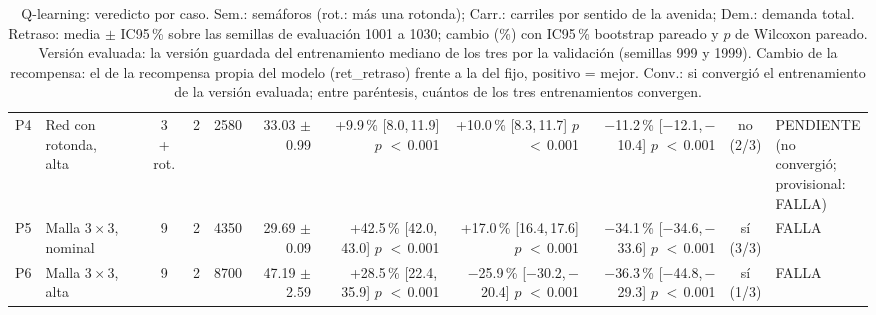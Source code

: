\begin{table}[H]
\begin{tabular}{llcrrrrrrcl}
P4 & \makecell[l]{Red con\\{}rotonda,\\{}alta} & \makecell[c]{3\\{}+ rot.} & 2 & 2580 & \makecell[r]{33.03\\{}$\pm$ 0.99} & \makecell[r]{+9.9\,\%\\{}[8.0,\,11.9]\\$p$ $<$\,0.001} & \makecell[r]{+10.0\,\%\\{}[8.3,\,11.7]\\$p$ $<$\,0.001} & \makecell[r]{$-$11.2\,\%\\{}[$-$12.1,\,$-$10.4]\\$p$ $<$\,0.001} & \makecell[c]{no\\{}(2/3)} & \makecell[l]{PENDIENTE\\{}(no convergió;\\{}provisional:\\{}FALLA)} \\
P5 & \makecell[l]{Malla $3 \times 3$,\\{}nominal} & 9 & 2 & 4350 & \makecell[r]{29.69\\{}$\pm$ 0.09} & \makecell[r]{+42.5\,\%\\{}[42.0,\,43.0]\\$p$ $<$\,0.001} & \makecell[r]{+17.0\,\%\\{}[16.4,\,17.6]\\$p$ $<$\,0.001} & \makecell[r]{$-$34.1\,\%\\{}[$-$34.6,\,$-$33.6]\\$p$ $<$\,0.001} & \makecell[c]{sí\\{}(3/3)} & FALLA \\
P6 & \makecell[l]{Malla $3 \times 3$,\\{}alta} & 9 & 2 & 8700 & \makecell[r]{47.19\\{}$\pm$ 2.59} & \makecell[r]{+28.5\,\%\\{}[22.4,\,35.9]\\$p$ $<$\,0.001} & \makecell[r]{$-$25.9\,\%\\{}[$-$30.2,\,$-$20.4]\\$p$ $<$\,0.001} & \makecell[r]{$-$36.3\,\%\\{}[$-$44.8,\,$-$29.3]\\$p$ $<$\,0.001} & \makecell[c]{sí\\{}(1/3)} & FALLA \\
\bottomrule
\end{tabular}
\caption[Veredicto de Q-learning]{Q-learning: veredicto por caso. Sem.: semáforos (rot.: más una rotonda); Carr.: carriles por sentido de la avenida; Dem.: demanda total. Retraso: media $\pm$ IC95\,\% sobre las semillas de evaluación 1001 a 1030; cambio (\%) con IC95\,\% bootstrap pareado y $p$ de Wilcoxon pareado. Versión evaluada: la versión guardada del entrenamiento mediano de los tres por la validación (semillas 999 y 1999). Cambio de la recompensa: el de la recompensa propia del modelo (ret\_retraso) frente a la del fijo, positivo = mejor. Conv.: si convergió el entrenamiento de la versión evaluada; entre paréntesis, cuántos de los tres entrenamientos convergen.}
\label{tab:veredicto-ql}
\end{table}
